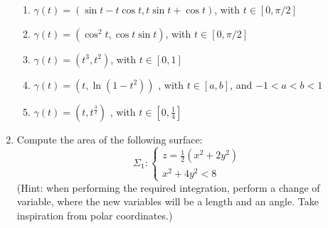 \documentclass[fleqn]{article}
\begin{document}
\begin{enumerate}
      \begin{enumerate}
      \item 
      $\gamma(t)=(\sin t-t\cos t,t\sin t+\cos t)$,  with $t\in [0,\pi/2]$  
      \item $\gamma(t) =  (\cos^2 t,\cos t \sin t )$,    with 
      $t \in  [0, \pi/2]$    
      \item  $\gamma(t)=(t^3,t^2)$, with $ t\in[0,1] $    
      \item  $\gamma(t)= (t,\ln (1-t^2))$ , with $ t\in [a,b]$, and $-1<a<b<1 $ 
      \item  $\gamma(t)=(t,t^{\frac{3}{2}})$ , with $t\in [0,\frac{1}{4}]$ 
      
      \end{enumerate}
    
    \item Compute the area of the following surface: 
      \begin{equation}
      \Sigma_1 : \begin{cases}
                    z=\frac{1}{2}\left( x^2+2y^2 \right)  \\
                    x^2+4y^2<8
                  \end{cases}
                  \nonumber
      \end{equation}
    (Hint: when performing the required integration, perform a change of variable, where the new variables will be a length and an angle. Take inspiration from polar coordinates.)
    
  \end{enumerate}
\end{document}
